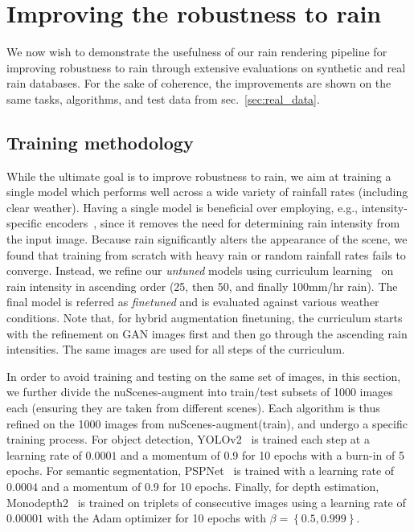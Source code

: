 \section{Improving the robustness to rain}
\label{sec:improving}

We now wish to demonstrate the usefulness of our rain rendering pipeline for improving robustness to rain through extensive evaluations on synthetic and real rain databases. For the sake of coherence, the improvements are shown on the same tasks, algorithms, and test data from sec.~\ref{sec:real_data}.

\subsection{Training methodology}

While the ultimate goal is to improve robustness to rain, we aim at training a single model which performs well across a wide variety of rainfall rates (including clear weather). Having a single model is beneficial over employing, e.g., intensity-specific encoders~\cite{porav2019can}, since it removes the need for determining rain intensity from the input image. 
Because rain significantly alters the appearance of the scene, we found that training from scratch with heavy rain or random rainfall rates fails to converge.
Instead, we refine our \textit{untuned} models using curriculum learning~\cite{bengio2009curriculum} on rain intensity in ascending order (25, then 50, and finally 100mm/hr rain). The final model is referred as \textit{finetuned} and is evaluated against various weather conditions. Note that, for hybrid augmentation finetuning, the curriculum starts with the refinement on GAN images first and then go through the ascending rain intensities. The same images are used for all steps of the curriculum.

In order to avoid training and testing on the same set of images, in this section, we further divide the nuScenes-augment into train/test subsets of 1000 images each (ensuring they are taken from different scenes). 
Each algorithm is thus refined on the 1000 images from nuScenes-augment(train), and undergo a specific training process. For object detection, YOLOv2~\cite{redmon2017yolo9000} is trained each step at a learning rate of $0.0001$ and a momentum of 0.9 for 10 epochs with a burn-in of 5 epochs. For semantic segmentation, PSPNet~\cite{zhao2017pspnet} is trained with a learning rate of $0.0004$ and a momentum of 0.9 for 10 epochs. Finally, for depth estimation, Monodepth2~\cite{godard2019digging} is trained on triplets of consecutive images using a learning rate of $0.00001$ with the Adam optimizer for 10 epochs with $\beta = \left\{ 0.5, 0.999 \right\}$.  


